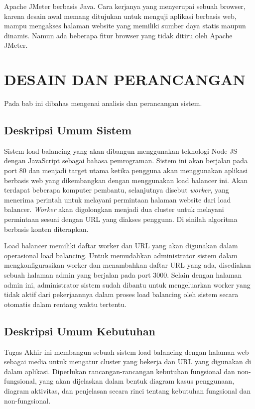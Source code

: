\documentclass{ta-its}
\begin{document}
			Apache JMeter berbasis Java. Cara kerjanya yang menyerupai sebuah browser, karena desain awal memang ditujukan untuk menguji aplikasi berbasis web, mampu mengakses halaman website yang memiliki sumber daya statis maupun dinamis. Namun ada beberapa fitur browser yang tidak ditiru oleh Apache JMeter.


    \chapter{DESAIN DAN PERANCANGAN}
	    Pada bab ini dibahas mengenai analisis dan perancangan sistem.
	    
	    \section{Deskripsi Umum Sistem}
		    Sistem load balancing yang akan dibangun menggunakan teknologi Node JS dengan JavaScript sebagai bahasa pemrograman. Sistem ini akan berjalan pada port 80 dan menjadi target utama ketika pengguna akan menggunakan aplikasi berbasis web yang dikembangkan dengan menggunakan load balancer ini. Akan terdapat beberapa komputer pembantu, selanjutnya disebut \textit{worker}, yang menerima perintah untuk melayani permintaan halaman website dari load balancer. \textit{Worker} akan digolongkan menjadi dua cluster untuk melayani permintaan sesuai dengan URL yang diakses pengguna. Di sinilah algoritma berbasis konten diterapkan.
		    
		    Load balancer memiliki daftar worker dan URL yang akan digunakan dalam operasional load balancing. Untuk memudahkan administrator sistem dalam mengkonfigurasikan worker dan menambahkan daftar URL yang ada, disediakan sebuah halaman admin yang berjalan pada port 3000. Selain dengan halaman admin ini, administrator sistem sudah dibantu untuk mengeluarkan worker yang tidak aktif dari pekerjaannya dalam proses load balancing oleh sistem secara otomatis dalam rentang waktu tertentu.
		    
		\section{Deskripsi Umum Kebutuhan}
			Tugas Akhir ini membangun sebuah sistem load balancing dengan halaman web sebagai media untuk mengatur cluster yang bekerja dan URL yang digunakan di dalam aplikasi. Diperlukan rancangan-rancangan kebutuhan fungsional dan non-fungsional, yang akan dijelaskan dalam bentuk diagram kasus penggunaan, diagram aktivitas, dan penjelasan secara rinci tentang kebutuhan fungsional dan non-fungsional.
			
\end{document}
